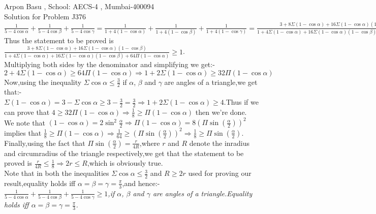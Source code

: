 \documentclass[10pt,a4paper]{extarticle}
\begin{document}
 
 Arpon Basu , School: AECS-4 , Mumbai-400094\\
 
 Solution for Problem J376 \\






 $\frac{1}{5-4\cos\alpha}+\frac{1}{5-4\cos\beta}+\frac{1}{5-4\cos\gamma}=\frac{1}{1+4(1-\cos\alpha)}+\frac{1}{1+4(1-\cos\beta)}+\frac{1}{1+4(1-\cos\gamma)}=\frac{3+8\Sigma (1-\cos\alpha)+16\Sigma (1-\cos\alpha)(1-\cos\beta)}{1+4\Sigma (1-\cos\alpha)+16\Sigma (1-\cos\alpha)(1-\cos\beta)+64\Pi (1-\cos\alpha)}$\\
Thus the statement to be proved is $\frac{3+8\Sigma (1-\cos\alpha)+16\Sigma (1-\cos\alpha)(1-\cos\beta)}{1+4\Sigma (1-\cos\alpha)+16\Sigma (1-\cos\alpha)(1-\cos\beta)+64\Pi (1-\cos\alpha)}\geq 1$.\\
Multiplying both sides by the denominator and simplifying we get:-\\
$2+4\Sigma (1-\cos\alpha)\geq 64\Pi (1-\cos\alpha)\Rightarrow 1+2\Sigma (1-\cos\alpha)\geq 32\Pi (1-\cos\alpha)$\\
Now,using the inequality $\Sigma \cos\alpha \leq \frac{3}{2}$ if $\alpha$, $\beta$ and $\gamma$ are angles of a triangle,we get that:-\\
$\Sigma (1-\cos\alpha)=3-\Sigma \cos\alpha \geq 3-\frac{3}{2}=\frac{3}{2}\Rightarrow 1+2\Sigma (1-\cos\alpha)\geq 4$.Thus if we can prove that $4\geq 32\Pi (1-\cos\alpha)\Rightarrow \frac{1}{8}\geq \Pi (1-\cos\alpha)$ then we're done.\\
We note that $(1-\cos\alpha)=2\sin^{2} \frac{\alpha}{2}\Rightarrow \Pi (1-\cos\alpha)=8(\Pi \sin(\frac{\alpha}{2}))^{2}$ implies that $\frac{1}{8}\geq \Pi (1-\cos\alpha) \Rightarrow \frac{1}{64}\geq (\Pi \sin(\frac{\alpha}{2}))^{2}\Rightarrow \frac{1}{8}\geq \Pi \sin(\frac{\alpha}{2})$.\\
Finally,using the fact that $\Pi \sin(\frac{\alpha}{2})=\frac{r}{4R}$,where $r$ and $R$ denote the inradius and circumradius of the triangle respectively,we get that the statement to be proved is $\frac{r}{4R}\leq \frac{1}{8}\Rightarrow 2r\leq R$,which is obviously true.\\
Note that in both the inequalities $\Sigma \cos\alpha \leq \frac{3}{2}$ and $R\geq 2r$ used for proving our result,equality holds iff $\alpha=\beta=\gamma=\frac{\pi}{3}$,and hence:-\\
\emph{$\frac{1}{5-4\cos\alpha}+\frac{1}{5-4\cos\beta}+\frac{1}{5-4\cos\gamma}\geq 1$,if $\alpha$, $\beta$ and $\gamma$ are angles of a triangle.Equality holds iff $\alpha=\beta=\gamma=\frac{\pi}{3}$.}\\
\end{document}
